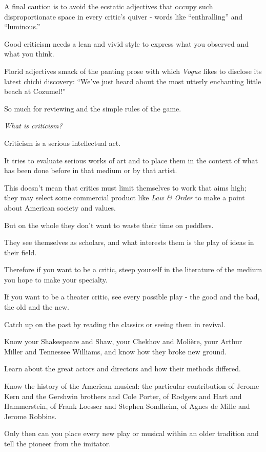 \documentclass{book}
\numberwithin{equation}{section}
\begin{document}
%
A final caution is to avoid the ecstatic adjectives that occupy such disproportionate space in every critic's quiver - words like ``enthralling'' and ``luminous.''

Good criticism needs a lean and vivid style to express what you observed and what you think.

Florid adjectives smack of the panting prose with which \textit{Vogue} likes to disclose its latest chichi discovery: ``We've just heard about the most utterly enchanting little beach at Cozumel!''

%
So much for reviewing and the simple rules of the game.

\textit{What is criticism?}

%
Criticism is a serious intellectual act.

It tries to evaluate serious works of art and to place them in the context of what has been done before in that medium or by that artist.

This doesn't mean that critics must limit themselves to work that aims high; they may select some commercial product like \textit{Law \& Order} to make a point about American society and values.

But on the whole they don't want to waste their time on peddlers.

They see themselves as scholars, and what interests them is the play of ideas in their field.

%
Therefore if you want to be a critic, steep yourself in the literature of the medium you hope to make your specialty.

If you want to be a theater critic, see every possible play - the good and the bad, the old and the new.

Catch up on the past by reading the classics or seeing them in revival.

Know your Shakespeare and Shaw, your Chekhov and Moli\`ere, your Arthur Miller and Tennessee Williams, and know how they broke new ground.

Learn about the great actors and directors and how their methods differed.

Know the history of the American musical: the particular contribution of Jerome Kern and the Gershwin brothers and Cole Porter, of Rodgers and Hart and Hammerstein, of Frank Loesser and Stephen Sondheim, of Agnes de Mille and Jerome Robbins.

Only then can you place every new play or musical within an older tradition and tell the pioneer from the imitator.
\end{document}
